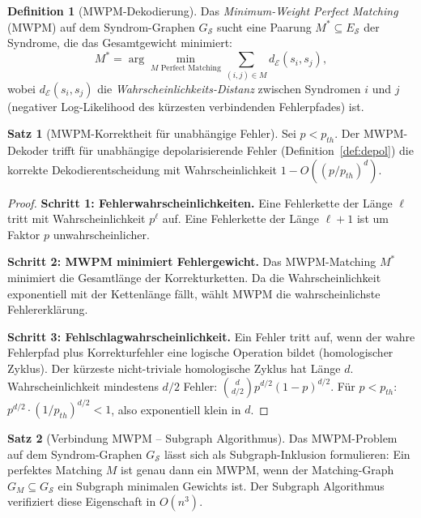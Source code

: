 ﻿\documentclass[a4paper,12pt]{article}
\theoremstyle{definition}
\newtheorem{definition}{Definition}
\newtheorem{satz}{Satz}
\begin{document}
\begin{definition}[MWPM-Dekodierung]
Das \emph{Minimum-Weight Perfect Matching} (MWPM) auf dem Syndrom-Graphen
$G_{\mathcal{S}}$ sucht eine Paarung $M^* \subseteq E_{\mathcal{S}}$
der Syndrome, die das Gesamtgewicht minimiert:
\[
M^* = \arg\min_{M \text{ Perfect Matching}} \sum_{(i,j) \in M} d_{\mathcal{E}}(s_i, s_j),
\]
wobei $d_{\mathcal{E}}(s_i, s_j)$ die \emph{Wahrscheinlichkeits-Distanz}
zwischen Syndromen $i$ und $j$ (negativer Log-Likelihood des k\"urzesten
verbindenden Fehlerpfades) ist.
\end{definition}

\begin{satz}[MWPM-Korrektheit f\"ur unabh\"angige Fehler]
\label{satz:mwpm_korrekt}
Sei $p < p_{th}$. Der MWPM-Dekoder trifft f\"ur unabh\"angige depolarisierende
Fehler (Definition~\ref{def:depol}) die korrekte Dekodierentscheidung mit
Wahrscheinlichkeit $1 - O((p/p_{th})^d)$.
\end{satz}

\begin{proof}
\textbf{Schritt 1: Fehlerwahrscheinlichkeiten.}
Eine Fehlerkette der L\"ange $\ell$ tritt mit Wahrscheinlichkeit $p^\ell$ auf.
Eine Fehlerkette der L\"ange $\ell + 1$ ist um Faktor $p$ unwahrscheinlicher.

\textbf{Schritt 2: MWPM minimiert Fehlergewicht.}
Das MWPM-Matching $M^*$ minimiert die Gesamtl\"ange der Korrekturketten.
Da die Wahrscheinlichkeit exponentiell mit der Kettenl\"ange f\"allt,
w\"ahlt MWPM die wahrscheinlichste Fehlererkl\"arung.

\textbf{Schritt 3: Fehlschlagwahrscheinlichkeit.}
Ein Fehler tritt auf, wenn der wahre Fehlerpfad plus Korrekturfehler
eine logische Operation bildet (homologischer Zyklus). Der k\"urzeste
nicht-triviale homologische Zyklus hat L\"ange $d$.
Wahrscheinlichkeit mindestens $d/2$ Fehler: $\binom{d}{d/2}p^{d/2}(1-p)^{d/2}$.
F\"ur $p < p_{th}$: $p^{d/2} \cdot (1/p_{th})^{d/2} < 1$, also exponentiell klein
in $d$. \end{proof}

\begin{satz}[Verbindung MWPM -- Subgraph Algorithmus]
\label{satz:mwpm_subgraph}
Das MWPM-Problem auf dem Syndrom-Graphen $G_{\mathcal{S}}$ l\"asst sich als
Subgraph-Inklusion formulieren: Ein perfektes Matching $M$ ist genau dann
ein MWPM, wenn der Matching-Graph $G_M \subseteq G_{\mathcal{S}}$ ein
Subgraph minimalen Gewichts ist. Der Subgraph Algorithmus~\cite{epp2026subgraph}
verifiziert diese Eigenschaft in $O(n^3)$.
\end{satz}
\end{document}
